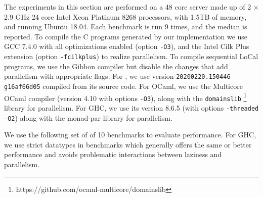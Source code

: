 \documentclass[showabstract,showacknowledgments,showpreface,showdedication,school]{iuphd}
\theoremstyle{nonumberplain}
\newcommand{\MPL}{\text{MaPLe}}
\newcommand{\textred}[1]{{\color{comment-red}{#1}}}
\newcommand{\textred}[1]{{\color{comment-red}{#1}}}
\newcommand{\Red}[1]{\textred{#1}}
\newcommand{\il}[1]{\lstinline[style=inline,mathescape=true];#1;}
\begin{document}
The experiments in this section are performed on a 48 core server made up of
2 $\times$ 2.9 GHz 24 core Intel Xeon Platinum 8268 processors, with 1.5TB of memory,
and running Ubuntu 18.04.
Each benchmark is run 9 times, and the median is reported.
To compile the C programs generated by our implementation we use
GCC 7.4.0 with all optimizations enabled (option \il{-O3}), and
the Intel Cilk Plus extension (option \il{-fcilkplus}) to realize parallelism.
To compile sequential LoCal programs, we use the Gibbon compiler but disable the
changes that add parallelism with appropriate flags.
For \MPL{}, we use version \il{20200220.150446-g16af66d05} compiled from its source code.
For OCaml, we use the Multicore OCaml compiler \cite{multicore-ocaml}
(version 4.10 with options \il{-O3}),
along with the \il{domainslib} \footnote{https://github.com/ocaml-multicore/domainslib}
library for parallelism.
For GHC, we use its version 8.6.5 (with options \il{-threaded -O2}) along with
the monad-par\cite{monad-par} library for parallelism.

\newcommand{\numbenchmarks}{\Red{10} }

We use the following set of of 10 benchmarks to evaluate performance.
For GHC, we use strict datatypes in benchmarks which generally offers the
same or better performance and avoids problematic interactions between
laziness and parallelism.
\end{document}
